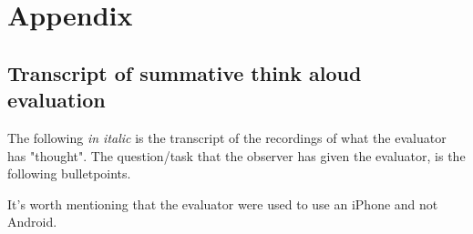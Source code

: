 \documentclass[runningheads,a4paper]{llncs}
\begin{document}
\section*{Appendix}

\subsection*{Transcript of summative think aloud evaluation}\label{transcript}
The following \textit{in italic} is the transcript of the recordings of what the evaluator has "thought". The question/task that the observer has given the evaluator, is the following bulletpoints. 

It's worth mentioning that the evaluator were used to use an iPhone and not Android. \\
\end{document}
